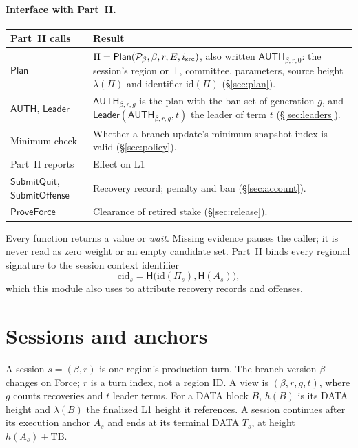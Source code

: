 \documentclass[11pt,a4paper]{article}
\newcommand{\Hash}{\mathsf H}
\newcommand{\tagg}[1]{\mathsf{#1}}
\newcommand{\cid}{\mathrm{cid}}
\begin{document}
\paragraph{Interface with Part~II.}\leavevmode\par
\begin{tabularx}{\linewidth}{@{}>{\raggedright\arraybackslash}p{.22\linewidth}Y@{}}\toprule
Part~II calls & Result\\\midrule
$\tagg{Plan}$ & $\Pi=\tagg{Plan}(\mathcal P_\beta,\beta,r,E,i_{\rm src})$,
also written $\tagg{AUTH}_{\beta,r,0}$: the session's region or $\bot$,
committee, parameters, source height $\lambda(\Pi)$ and identifier
$\mathrm{id}(\Pi)$ (\S\ref{sec:plan}).\\
$\tagg{AUTH}$, $\tagg{Leader}$ & $\tagg{AUTH}_{\beta,r,g}$ is the plan with the
ban set of generation $g$, and $\tagg{Leader}(\tagg{AUTH}_{\beta,r,g},t)$ the
leader of term $t$ (\S\ref{sec:leaders}).\\
Minimum check & Whether a branch update's minimum snapshot index is valid
(\S\ref{sec:policy}).\\\midrule
Part~II reports & Effect on L1\\\midrule
$\tagg{SubmitQuit}$, $\tagg{SubmitOffense}$ & Recovery record; penalty and
ban (\S\ref{sec:account}).\\
$\tagg{ProveForce}$ & Clearance of retired stake (\S\ref{sec:release}).\\\bottomrule
\end{tabularx}

Every function returns a value or \emph{wait}. Missing evidence pauses
the caller; it is never read as zero weight or an empty candidate set.
Part~II binds every regional signature to the session context identifier
\[
 \cid_s=\Hash\bigl(\mathrm{id}(\Pi_s),\Hash(A_s)\bigr),
\]
which this module also uses to attribute recovery records and offenses.

\section{Sessions and anchors}
\label{sec:anchors}
A session $s=(\beta,r)$ is one region's production turn. The branch
version $\beta$ changes on Force; $r$ is a turn index, not a region ID. A
view is $(\beta,r,g,t)$, where $g$ counts recoveries and $t$ leader terms.
For a DATA block $B$, $h(B)$ is its DATA height and $\lambda(B)$ the
finalized L1 height it references. A session continues after its
execution anchor $A_s$ and ends at its terminal DATA $T_s$, at height
$h(A_s)+\mathrm{TB}$.
\end{document}
